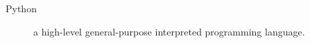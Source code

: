 \begin{description}
    \item[Python] a high-level general-purpose interpreted programming language.
    \end{description}
